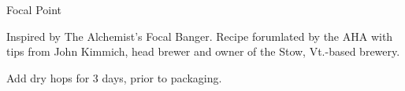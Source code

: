 \begin{recipe}{Focal Point}

\begin{aboutblock}
Inspired by The Alchemist's Focal Banger. Recipe forumlated by the AHA with
tips from John Kimmich, head brewer and owner of the Stow, Vt.-based brewery.
\sourceaha
\end{aboutblock}


\begin{methodandtiming}

\begin{mashsteps}
\end{mashsteps}

\begin{directions}
Add dry hops for 3 days, prior to packaging. 
\end{directions}

\end{methodandtiming}

\recipebreak

\begin{ingredientsblock}

\begin{malts}
\end{malts}

\begin{hops}
\end{hops}


\end{ingredientsblock}

\end{recipe}

